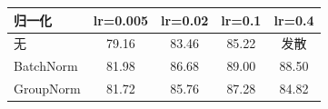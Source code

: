 \begin{tabular}{lcccc}
\toprule
归一化 & lr=0.005 & lr=0.02 & lr=0.1 & lr=0.4 \\
\midrule
无 & 79.16 & 83.46 & 85.22 & 发散 \\
BatchNorm & 81.98 & 86.68 & 89.00 & 88.50 \\
GroupNorm & 81.72 & 85.76 & 87.28 & 84.82 \\
\bottomrule
\end{tabular}
